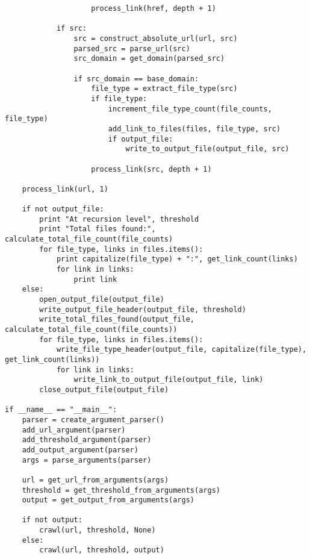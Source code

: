 \documentclass{article}
\begin{document}
\begin{verbatim}
                    process_link(href, depth + 1)
            
            if src:
                src = construct_absolute_url(url, src)
                parsed_src = parse_url(src)
                src_domain = get_domain(parsed_src)
                
                if src_domain == base_domain:
                    file_type = extract_file_type(src)
                    if file_type:
                        increment_file_type_count(file_counts, file_type)
                        add_link_to_files(files, file_type, src)
                        if output_file:
                            write_to_output_file(output_file, src)
                    
                    process_link(src, depth + 1)
    
    process_link(url, 1)
    
    if not output_file:
        print "At recursion level", threshold
        print "Total files found:", calculate_total_file_count(file_counts)
        for file_type, links in files.items():
            print capitalize(file_type) + ":", get_link_count(links)
            for link in links:
                print link
    else:
        open_output_file(output_file)
        write_output_file_header(output_file, threshold)
        write_total_files_found(output_file, calculate_total_file_count(file_counts))
        for file_type, links in files.items():
            write_file_type_header(output_file, capitalize(file_type), get_link_count(links))
            for link in links:
                write_link_to_output_file(output_file, link)
        close_output_file(output_file)

if __name__ == "__main__":
    parser = create_argument_parser()
    add_url_argument(parser)
    add_threshold_argument(parser)
    add_output_argument(parser)
    args = parse_arguments(parser)
    
    url = get_url_from_arguments(args)
    threshold = get_threshold_from_arguments(args)
    output = get_output_from_arguments(args)
    
    if not output:
        crawl(url, threshold, None)
    else:
        crawl(url, threshold, output)

\end{verbatim}



\end{document}
